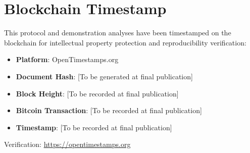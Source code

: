 \documentclass[11pt,a4paper]{article}
\begin{document}
\section{Blockchain Timestamp}
\label{app:blockchain}

This protocol and demonstration analyses have been timestamped on the blockchain for intellectual property protection and reproducibility verification:

\begin{itemize}
\item \textbf{Platform}: OpenTimestamps.org
\item \textbf{Document Hash}: [To be generated at final publication]
\item \textbf{Block Height}: [To be recorded at final publication]
\item \textbf{Bitcoin Transaction}: [To be recorded at final publication]
\item \textbf{Timestamp}: [To be recorded at final publication]
\end{itemize}

Verification: \url{https://opentimestamps.org}
\end{document}
